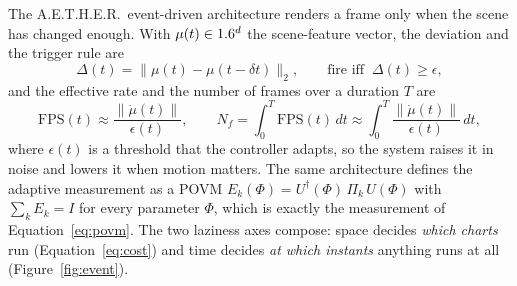 The A.E.T.H.E.R.\ event-driven architecture renders a frame only when the scene has changed enough. With $\mu(t)\in1.6^d$ the scene-feature vector, the deviation and the trigger rule are
\begin{equation}\label{eq:aether}
  \Delta(t)=\big\lVert\mu(t)-\mu(t-\delta t)\big\rVert_2,\qquad \text{fire iff }\ \Delta(t)\ge\epsilon,
\end{equation}
and the effective rate and the number of frames over a duration $T$ are
\begin{equation}\label{eq:fps}
  \mathrm{FPS}(t)\approx\frac{\lVert\dot\mu(t)\rVert}{\epsilon(t)},\qquad N_f=\int_0^T\mathrm{FPS}(t)\,dt\approx\int_0^T\frac{\lVert\dot\mu(t)\rVert}{\epsilon(t)}\,dt,
\end{equation}
where $\epsilon(t)$ is a threshold that the controller adapts, so the system raises it in noise and lowers it when motion matters. The same architecture defines the adaptive measurement as a POVM $E_k(\Phi)=U^\dagger(\Phi)\,\Pi_k\,U(\Phi)$ with $\sum_k E_k=I$ for every parameter $\Phi$, which is exactly the measurement of Equation~\eqref{eq:povm}. The two laziness axes compose: space decides \emph{which charts} run (Equation~\eqref{eq:cost}) and time decides \emph{at which instants} anything runs at all (Figure~\ref{fig:event}).

\begin{figure}[t]
  \centering
  
\end{figure}
